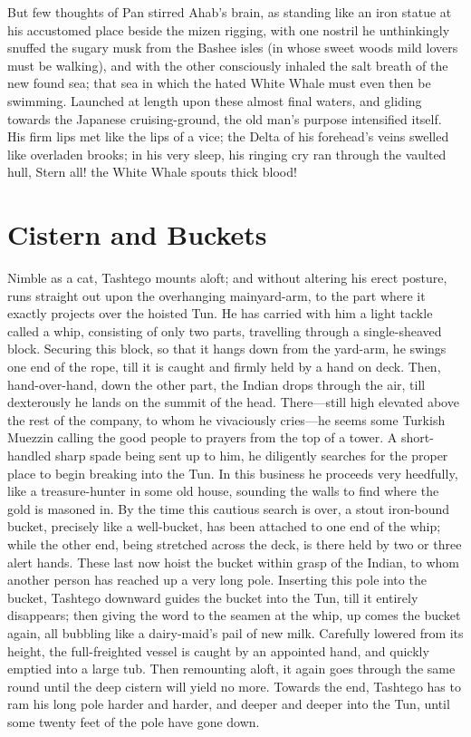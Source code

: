 \documentclass{article}
\begin{document}
   But few thoughts of Pan stirred Ahab's brain, as standing like an iron statue at his accustomed place beside the mizen
rigging, with one nostril he unthinkingly snuffed the sugary musk from the Bashee isles (in whose sweet woods mild lovers must be walking), and with the other consciously inhaled the salt breath of the new found sea; that sea in which the hated White Whale must even then be swimming. Launched at length upon these almost final waters, and gliding towards the Japanese cruising-ground, the old man's purpose intensified itself. His firm lips met like the lips of a vice; the Delta of his forehead's veins swelled like overladen brooks; in his very sleep, his ringing cry ran through the vaulted hull, Stern all! the White Whale spouts thick blood! 

\section{Cistern and Buckets}


 Nimble as a cat, Tashtego mounts aloft; and without altering his erect posture, runs straight out upon the overhanging mainyard-arm, to the part where it exactly projects over the hoisted Tun. He has carried with him a light tackle called a whip, consisting of only two parts, travelling through a single-sheaved block. Securing this block, so that it hangs down from the yard-arm, he swings one end of the rope, till it is caught and firmly held by a hand on deck. Then, hand-over-hand, down the other part, the Indian drops through the air, till dexterously he lands on the summit of the head. There—still high elevated above the rest of the company, to whom he vivaciously cries—he seems some Turkish Muezzin calling the good people to prayers from the top of a tower. A short-handled sharp spade being sent up to him, he diligently searches for the proper place to begin breaking into the Tun. In this business he proceeds very heedfully, like a treasure-hunter in some old house, sounding the walls to find where the gold is masoned in. By the time this cautious search is over, a stout iron-bound bucket, precisely like a well-bucket, has been attached to one end of the whip; while the other end, being stretched across the deck, is there held by two or three alert hands. These last now hoist the bucket within grasp of the Indian, to whom another person has reached up a very long pole. Inserting this pole into the bucket, Tashtego downward guides the bucket into the Tun, till it entirely disappears; then giving the word to the seamen at the whip, up comes the bucket again, all bubbling like a dairy-maid's pail of new milk. Carefully lowered from its height, the full-freighted vessel is caught by an appointed hand, and quickly emptied into a large tub. Then remounting aloft, it again goes through the same round until the deep cistern will yield no more. Towards the end, Tashtego has to ram his long pole harder and harder, and deeper and deeper into the Tun, until some twenty feet of the pole have gone down.
\end{document}
